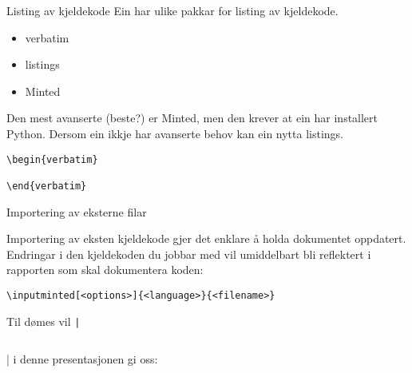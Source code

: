 \begin{frame}[containsverbatim]{Listing av kjeldekode}
	Ein har ulike pakkar for listing av kjeldekode.
	
	\begin{itemize}
		\item verbatim
		\item listings
		\item Minted
	\end{itemize}
	
	Den mest avanserte (beste?) er Minted, men den krever at ein har installert Python. Dersom ein ikkje har avanserte behov kan ein nytta listings.
	
	\begin{lstlisting}
\begin{verbatim}
	
\end{verbatim}
	\end{lstlisting}
	
\end{frame}


\begin{frame}[containsverbatim]{Importering av eksterne filar}
	
	Importering av eksten kjeldekode gjer det enklare å holda dokumentet oppdatert. Endringar i den kjeldekoden du jobbar med vil umiddelbart bli reflektert i rapporten som skal dokumentera koden:
	
	\begin{verbatim}
\inputminted[<options>]{<language>}{<filename>}
	\end{verbatim}
	
	Til dømes vil \texttt|\inputminted{csharp}{source-code/hello.cs}| i denne presentasjonen gi oss:
	
	\inputminted{csharp}{source-code/hello.cs}
	
\end{frame}
